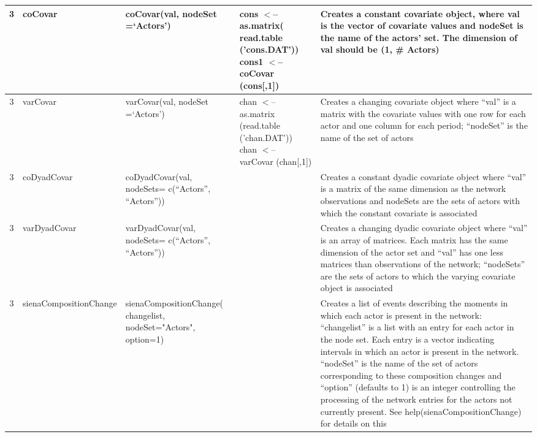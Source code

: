 \documentclass[a4paper,fleqn,11pt]{article}
\newcommand{\+}{\, + \,}
\begin{document}
{\begin{landscape}
\begin{small}
\begin{longtable}{c | p{2.4cm} | p{4.5cm} | p{4.0cm} | p{9.0cm} }
3 &coCovar & coCovar(val, \newline
nodeSet =`Actors') & cons $<$-- \newline
as.matrix( read.table \newline
('cons.DAT')) \newline cons1 $<$--\newline
 coCovar (cons[,1]) & Creates a constant
covariate object, where val is the vector of covariate values and nodeSet is
the name of the actors' set.  The dimension of val should be (1, \#
Actors)\\
\hline

3 & varCovar & varCovar(val, \newline
nodeSet =`Actors') & chan $<$-- as.matrix \newline
(read.table ('chan.DAT')) \newline chan $<$-- \newline
varCovar (chan[,1]) & Creates a
changing covariate object where ``val'' is a matrix with the covariate values
with one row for each actor and one column for each period; ``nodeSet'' is the
name of the set of actors \\
\hline

3& coDyadCovar &coDyadCovar(val, \newline
nodeSets= \newline
c(``Actors'', ``Actors'')) & &
Creates a constant dyadic covariate object where ``val'' is a matrix of the
same dimension as the network observations and nodeSets are the sets of actors
with
which the constant covariate is associated\\
\hline

3 &varDyadCovar & varDyadCovar(val, \newline
nodeSets= \newline
c(``Actors'', ``Actors'')) &
&Creates a changing dyadic covariate object where ``val'' is an array of
matrices. Each matrix has the same dimension of the actor set and ``val'' has
one less matrices than observations of the network; ``nodeSets'' are the sets
of actors to which the varying covariate object is associated\\
\hline

3 & sienaCompositionChange & \newline
sienaCompositionChange( changelist,\newline
nodeSet="Actors", \newline
option=1) & & Creates a list of events describing the moments
in which each actor is present in the network: ``changelist'' is a list with an
entry for each actor in the node set. Each entry is a vector indicating
intervals in which an actor is present in the network. ``nodeSet'' is the name
of the set of actors corresponding to these composition changes and ``option''
(defaults to 1) is an integer controlling the processing of the network entries
for the actors not currently present. See help(sienaCompositionChange) for
details on this\\
\hline


\end{longtable}
\end{small}
\end{landscape}}
\end{document}
